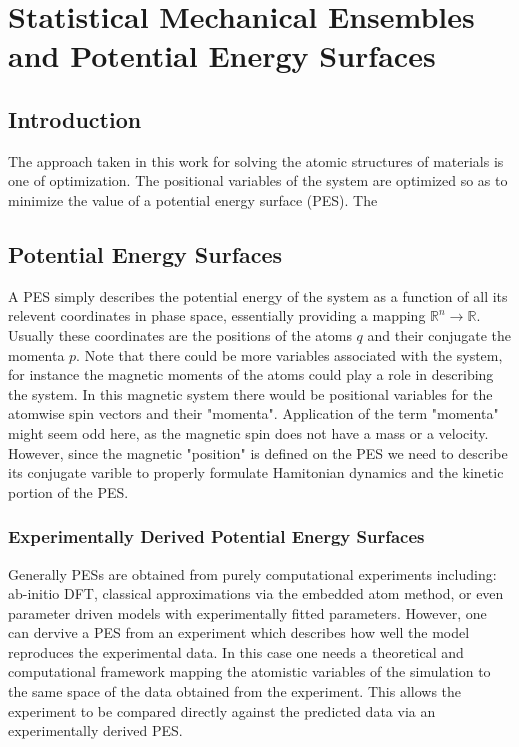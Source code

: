 \chapter{Statistical Mechanical Ensembles and Potential Energy Surfaces}
\section{Introduction}
The approach taken in this work for solving the atomic structures of materials is one of optimization.
The positional variables of the system are optimized so as to minimize the value of a potential energy surface (PES).
The 
\section{Potential Energy Surfaces}
A PES simply describes the potential energy of the system as a function of all its relevent coordinates in phase space, essentially providing a mapping $\mathbb{R}^{n} \rightarrow \mathbb{R}$.
Usually these coordinates are the positions of the atoms $q$ and their conjugate the momenta $p$.
Note that there could be more variables associated with the system, for instance the magnetic moments of the atoms could play a role in describing the system.
In this magnetic system there would be positional variables for the atomwise spin vectors and their "momenta".
Application of the term "momenta" might seem odd here, as the magnetic spin does not have a mass or a velocity.
However, since the magnetic "position" is defined on the PES we need to describe its conjugate varible to properly formulate Hamitonian dynamics and the kinetic portion of the PES.

\subsection{Experimentally Derived Potential Energy Surfaces}
Generally PESs are obtained from purely computational experiments including: ab-initio DFT, classical approximations via the embedded atom method, or even parameter driven models with experimentally fitted parameters.
However, one can dervive a PES from an experiment which describes how well the model reproduces the experimental data.
In this case one needs a theoretical and computational framework mapping the atomistic variables of the simulation to the same space of the data obtained from the experiment.
This allows the experiment to be compared directly against the predicted data via an experimentally derived PES.

